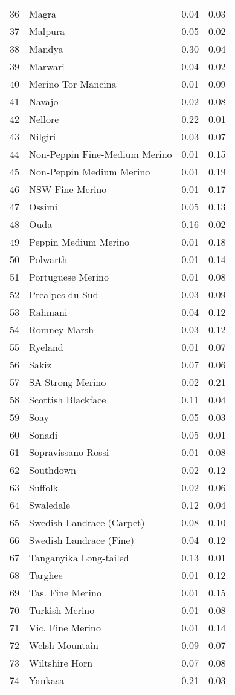 \begin{center}
\begin{longtable}{|p{1.0in}|p{2.0in}|p{1.0in}|p{1.0in}|}
  36 &  Magra & 0.04 & 0.03 \\ 
  37 &  Malpura & 0.05 & 0.02 \\ 
  38 &  Mandya & 0.30 & 0.04 \\ 
  39 &  Marwari & 0.04 & 0.02 \\ 
  40 &  Merino Tor Mancina & 0.01 & 0.09 \\ 
  41 &  Navajo & 0.02 & 0.08 \\ 
  42 &  Nellore & 0.22 & 0.01 \\ 
  43 &  Nilgiri & 0.03 & 0.07 \\ 
  44 &  Non-Peppin Fine-Medium Merino & 0.01 & 0.15 \\ 
  45 &  Non-Peppin Medium Merino & 0.01 & 0.19 \\ 
  46 &  NSW Fine Merino & 0.01 & 0.17 \\ 
  47 &  Ossimi & 0.05 & 0.13 \\ 
  48 &  Ouda & 0.16 & 0.02 \\ 
  49 &  Peppin Medium Merino & 0.01 & 0.18 \\ 
  50 &  Polwarth & 0.01 & 0.14 \\ 
  51 &  Portuguese Merino & 0.01 & 0.08 \\ 
  52 &  Prealpes du Sud & 0.03 & 0.09 \\ 
  53 &  Rahmani & 0.04 & 0.12 \\ 
  54 &  Romney Marsh & 0.03 & 0.12 \\ 
  55 &  Ryeland & 0.01 & 0.07 \\ 
  56 &  Sakiz & 0.07 & 0.06 \\ 
  57 &  SA Strong Merino & 0.02 & 0.21 \\ 
  58 &  Scottish Blackface & 0.11 & 0.04 \\ 
  59 &  Soay & 0.05 & 0.03 \\ 
  60 &  Sonadi & 0.05 & 0.01 \\ 
  61 &  Sopravissano Rossi & 0.01 & 0.08 \\ 
  62 &  Southdown & 0.02 & 0.12 \\ 
  63 &  Suffolk & 0.02 & 0.06 \\ 
  64 &  Swaledale & 0.12 & 0.04 \\ 
  65 &  Swedish Landrace (Carpet) & 0.08 & 0.10 \\ 
  66 &  Swedish Landrace (Fine) & 0.04 & 0.12 \\ 
  67 &  Tanganyika Long-tailed & 0.13 & 0.01 \\ 
  68 &  Targhee & 0.01 & 0.12 \\ 
  69 &  Tas. Fine Merino & 0.01 & 0.15 \\ 
  70 &  Turkish Merino & 0.01 & 0.08 \\ 
  71 &  Vic. Fine Merino & 0.01 & 0.14 \\ 
  72 &  Welsh Mountain & 0.09 & 0.07 \\ 
  73 &  Wiltshire Horn & 0.07 & 0.08 \\ 
  74 &  Yankasa & 0.21 & 0.03 \\ 
   \hline
\end{longtable}
\end{center}

